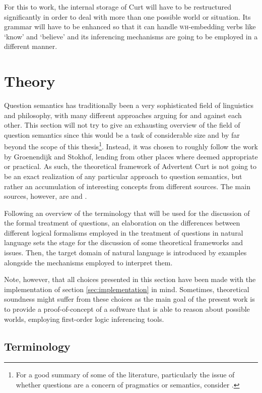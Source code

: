 \documentclass[11pt,a4paper]{article}
\newcommand{\pn}{\textsf} %
\newcommand{\wh}{\textsc{wh}}
\newcommand{\curt}{\pn{Curt}}
\newcommand{\acurt}{\pn{Advertent Curt}}
\theoremstyle{remark}
\theoremstyle{remark}
\theoremstyle{definition}
\begin{document}
For this to work, the internal storage of \curt{} will have to be restructured
significantly in order to deal with more than one possible world or situation.
Its grammar will have to be enhanced so that it can handle \wh-embedding verbs
like `know' and `believe' and its inferencing mechanisms are going to be
employed in a different manner. %

\section{Theory}\label{sec:theory}

Question semantics has traditionally been a very sophisticated field of
linguistics and philosophy, with many different approaches arguing for and
against each other. This section will not try to give an exhausting overview of
the field of question semantics since this would be a task of considerable size
and by far beyond the scope of this thesis\footnote{For a good summary of some
of the literature, particularly the issue of whether questions are a concern of
pragmatics or semantics, consider \cite[section 2 and 3]{gs:q}.}. Instead, it
was chosen to roughly follow the work by Groenendijk and Stokhof, lending from
other places where deemed appropriate or practical. As such, the theoretical
framework of \acurt{} is not going to be an exact realization of any particular
approach to question semantics, but rather an accumulation of interesting
concepts from different sources. The main sources, however, are \cite{gs:q} and
\cite{gs:sqpa}.

Following an overview of the terminology that will be used for the discussion of
the formal treatment of questions, an  elaboration on the differences between
different logical formalisms employed in the treatment of questions in natural
language sets the stage for the discussion of some theoretical frameworks and
issues. Then, the target domain of natural language is introduced by examples
alongside the mechanisms employed to interpret them. 

Note, however, that all choices presented in this section have been made
with the implementation of section \ref{sec:implementation} in mind.
Sometimes, theoretical soundness might suffer from these choices as the main
goal of the present work is to provide a proof-of-concept of a software that is
able to reason about possible worlds, employing first-order logic inferencing
tools. %

\subsection{Terminology}
\end{document}
